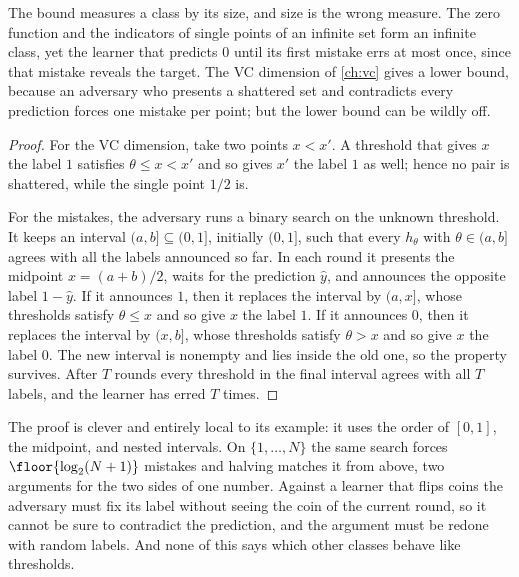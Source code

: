 \begin{refsection}
The bound measures a class by its size, and size is the wrong measure. The zero function and the indicators of single points of an infinite set form an infinite class, yet the learner that predicts $0$ until its first mistake errs at most once, since that mistake reveals the target. The VC dimension of \cref{ch:vc} gives a lower bound, because an adversary who presents a shattered set and contradicts every prediction forces one mistake per point; but the lower bound can be wildly off.


\begin{proof}
For the VC dimension, take two points $x<x'$. A threshold that gives $x$ the label $1$ satisfies $\theta\le x<x'$ and so gives $x'$ the label $1$ as well; hence no pair is shattered, while the single point $1/2$ is.

For the mistakes, the adversary runs a binary search on the unknown threshold. It keeps an interval $(a,b]\subseteq(0,1]$, initially $(0,1]$, such that every $h_\theta$ with $\theta\in(a,b]$ agrees with all the labels announced so far. In each round it presents the midpoint $x=(a+b)/2$, waits for the prediction $\hat y$, and announces the opposite label $1-\hat y$. If it announces $1$, then it replaces the interval by $(a,x]$, whose thresholds satisfy $\theta\le x$ and so give $x$ the label $1$. If it announces $0$, then it replaces the interval by $(x,b]$, whose thresholds satisfy $\theta>x$ and so give $x$ the label $0$. The new interval is nonempty and lies inside the old one, so the property survives. After $T$ rounds every threshold in the final interval agrees with all $T$ labels, and the learner has erred $T$ times.
\end{proof}

The proof is clever and entirely local to its example: it uses the order of $[0,1]$, the midpoint, and nested intervals. On $\{1,\dots,N\}$ the same search forces $\floor{\log_2(N+1)}$ mistakes and halving matches it from above, two arguments for the two sides of one number. Against a learner that flips coins the adversary must fix its label without seeing the coin of the current round, so it cannot be sure to contradict the prediction, and the argument must be redone with random labels. And none of this says which other classes behave like thresholds.


\end{refsection}
